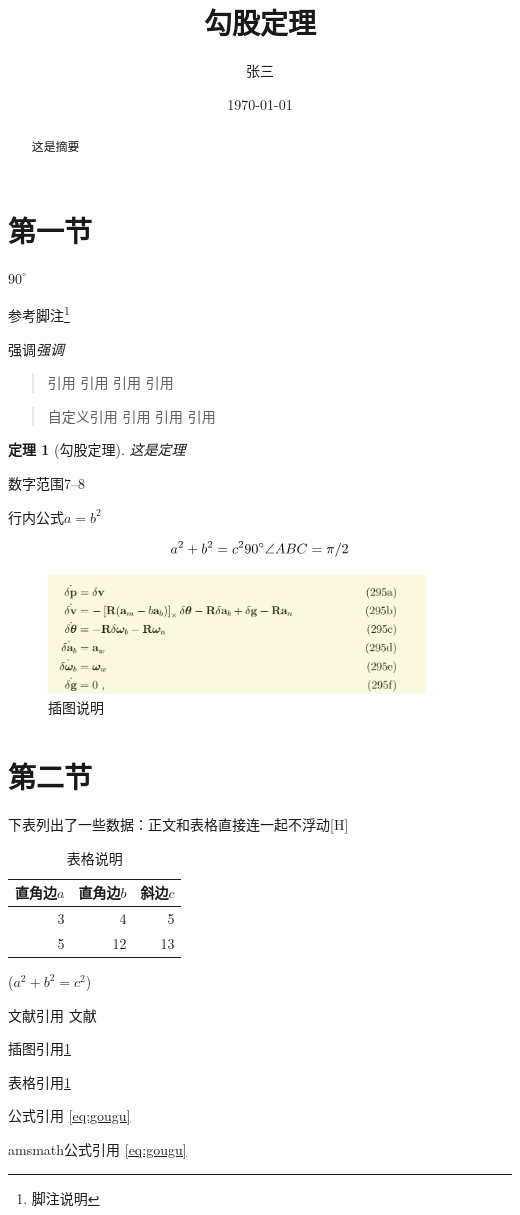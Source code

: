 \documentclass[UTF8]{ctexart}
\title{\heiti 勾股定理}
\author{\kaishu 张三}
\date{\today}
\newenvironment{myquote}
{\begin{quote}\kaishu\zihao{-5}}
{\end{quote}}
\newtheorem{thm}{定理}
\newcommand{\degree}{^\circ}
\begin{document}
\maketitle

\begin{abstract}
这是摘要
\end{abstract}

\tableofcontents


\section{第一节}

$90\degree$

参考脚注\footnote{脚注说明}

强调\emph{强调}

\begin{quote}
\kaishu 引用 引用 引用 引用 
\end{quote}

\begin{myquote}
自定义引用 引用 引用 引用 
\end{myquote}

\begin{thm}[勾股定理]
这是定理

\end{thm}


数字范围7--8

行内公式$a=b^2$

\begin{equation}\label{eq:gougu}
a^2 + b^2 = c^2 \\
90^{\circ}
\angle ABC = \pi / 2
\end{equation}


\begin{figure}[ht]
\centering
\includegraphics[scale=0.6,width=10cm]{image/test.png}
\caption{插图说明}
\label{fig:xiantu}
\end{figure}

\section{第二节}
下表列出了一些数据：正文和表格直接连一起不浮动[H]
\begin{table}[H]
\begin{tabular}{|rrr|}
\hline
直角边$a$ & 直角边$b$ & 斜边$c$ \\
\hline
3 & 4 & 5 \\
5 & 12 & 13 \\
\hline
\end{tabular}%
\qquad
($a^2 + b^2 = c^2$)
\caption{表格说明}
\label{table:test1}
\end{table}


文献引用\cite{Kline}
文献\cite{quanjing}

插图引用\ref{fig:xiantu} 

表格引用\ref{table:test1}

公式引用 \ref{eq:gougu}

amsmath公式引用 \eqref{eq:gougu} 

 

\nocite{Shiye}

\end{document}
